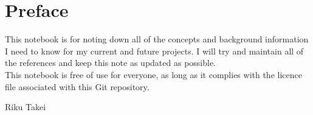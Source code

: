 
\chapter*{Preface}
\label{cha:preface}

This notebook is for noting down all of the concepts and background information I need to know for my current and future projects.
I will try and maintain all of the references and keep this note as updated as possible.
\\

\noindent
This notebook is free of use for everyone, as long as it complies with the licence file associated with this Git repository.

\vfill

Riku Takei
